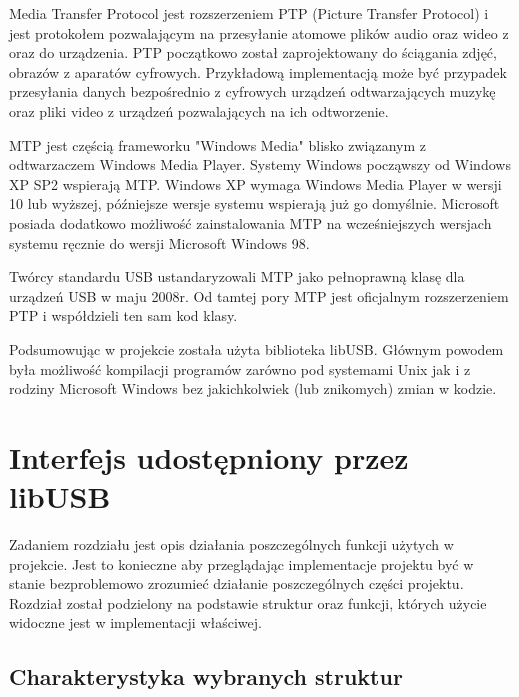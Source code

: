 \documentclass{BscUS}
\begin{document}
Media Transfer Protocol jest rozszerzeniem PTP (Picture Transfer Protocol) i jest protokołem pozwalającym na przesyłanie atomowe plików audio oraz wideo z oraz do urządzenia. PTP początkowo został zaprojektowany do ściągania zdjęć, obrazów z aparatów cyfrowych. Przykładową implementacją może być przypadek przesyłania danych bezpośrednio z cyfrowych urządzeń odtwarzających muzykę oraz pliki video z urządzeń pozwalających na ich odtworzenie.

MTP jest częścią frameworku "Windows Media" blisko związanym z odtwarzaczem Windows Media Player. Systemy Windows począwszy od Windows XP SP2 wspierają MTP. Windows XP wymaga Windows Media Player w wersji 10 lub wyższej, późniejsze wersje systemu wspierają już go domyślnie. Microsoft posiada dodatkowo możliwość zainstalowania MTP na wcześniejszych wersjach systemu ręcznie do wersji Microsoft Windows 98.

Twórcy standardu USB ustandaryzowali MTP jako pełnoprawną klasę dla urządzeń USB w maju 2008r.
Od tamtej pory MTP jest oficjalnym rozszerzeniem PTP i współdzieli ten sam kod klasy. \cite{winusbDesc, micrDevAppUSBDev, micrAccUsbDev, micCommWithUsb}
\newline

\indent Podsumowując w projekcie została użyta biblioteka libUSB. Głównym powodem była możliwość kompilacji programów zarówno pod systemami Unix jak i z rodziny Microsoft Windows bez jakichkolwiek (lub znikomych) zmian w kodzie.

\chapter{Interfejs udostępniony przez libUSB}
\label{libUsbChapter}
\indent Zadaniem rozdziału jest opis działania poszczególnych funkcji użytych w projekcie. Jest to konieczne aby przeglądając implementacje projektu być w stanie bezproblemowo zrozumieć działanie poszczególnych części projektu. Rozdział został podzielony na podstawie struktur oraz funkcji, których użycie widoczne jest w implementacji właściwej. \cite{libusbDoc}
\section{Charakterystyka wybranych struktur}
\end{document}
